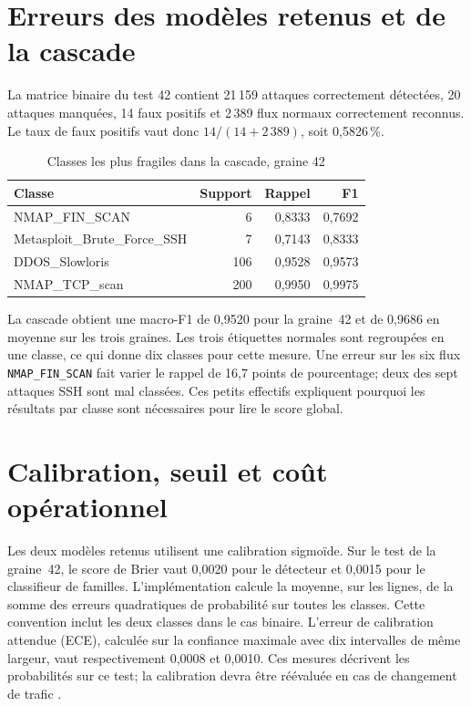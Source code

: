 \section{Erreurs des modèles retenus et de la cascade}

La matrice binaire du test 42 contient 21\,159 attaques correctement d\'etect\'ees,
20 attaques manqu\'ees, 14 faux positifs et 2\,389 flux normaux correctement
reconnus. Le taux de faux positifs vaut donc
$14 / (14 + 2\,389)$, soit 0,5826\,\%.

\begin{table}[htbp]
  \centering
  \caption{Classes les plus fragiles dans la cascade, graine 42}
  \label{tab:rare-errors}
  \begin{tabular}{lrrr}
    \toprule
    Classe & Support & Rappel & F1 \\
    \midrule
    NMAP\_FIN\_SCAN & 6 & 0,8333 & 0,7692 \\
    Metasploit\_Brute\_Force\_SSH & 7 & 0,7143 & 0,8333 \\
    DDOS\_Slowloris & 106 & 0,9528 & 0,9573 \\
    NMAP\_TCP\_scan & 200 & 0,9950 & 0,9975 \\
    \bottomrule
  \end{tabular}
\end{table}

La cascade obtient une macro-F1 de 0,9520 pour la graine~42 et de 0,9686 en
moyenne sur les trois graines. Les trois étiquettes normales sont regroupées en
une classe, ce qui donne dix classes pour cette mesure. Une erreur sur les six
flux \texttt{NMAP\_FIN\_SCAN} fait varier le rappel de 16,7 points de pourcentage;
deux des sept attaques SSH sont mal classées. Ces petits effectifs expliquent
pourquoi les résultats par classe sont nécessaires pour lire le score global.

\section{Calibration, seuil et co\^ut op\'erationnel}

Les deux modèles retenus utilisent une calibration sigmoïde. Sur le test de la
graine~42, le score de Brier vaut 0,0020 pour le détecteur et 0,0015 pour le
classifieur de familles. L'implémentation calcule la moyenne, sur les lignes,
de la somme des erreurs quadratiques de probabilité sur toutes les classes.
Cette convention inclut les deux classes dans le cas binaire. L'erreur de
calibration attendue (ECE), calculée sur la confiance maximale avec dix intervalles de même largeur,
vaut respectivement
0,0008 et 0,0010. Ces mesures décrivent les probabilités sur ce test; la
calibration devra être réévaluée en cas de changement de trafic
\citep{sklearn_calibration}.

